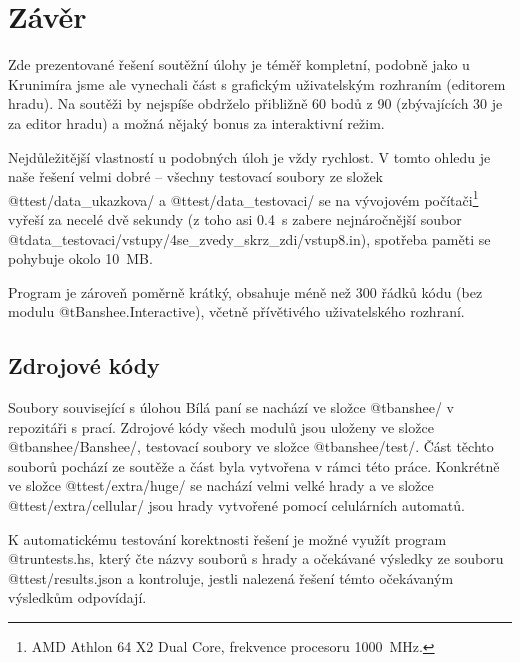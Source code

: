 




\section{Závěr}

Zde prezentované řešení soutěžní úlohy je téměř kompletní, podobně jako u
Krunimíra jsme ale vynechali část s grafickým uživatelským rozhraním (editorem
hradu). Na soutěži by nejspíše obdrželo přibližně 60 bodů z 90 (zbývajících 30
je za editor hradu) a možná nějaký bonus za interaktivní režim.

Nejdůležitější vlastností u podobných úloh je vždy rychlost. V tomto ohledu je
naše řešení velmi dobré -- všechny testovací soubory ze složek
@t{test/data_ukazkova/} a @t{test/data_testovaci/} se na vývojovém
počítači\footnote{AMD Athlon\texttrademark{} 64 X2 Dual Core, frekvence
procesoru 1000~MHz.} vyřeší za necelé dvě sekundy (z toho asi 0.4~s zabere
nejnáročnější soubor @t{data_testovaci/vstupy/4se_zvedy_skrz_zdi/vstup8.in}),
spotřeba paměti se pohybuje okolo 10~MB.

Program je zároveň poměrně krátký, obsahuje méně než 300 řádků kódu (bez modulu
@t{Banshee.Interactive}), včetně přívětivého uživatelského rozhraní.

\subsection{Zdrojové kódy}

Soubory související s úlohou Bílá paní se nachází ve složce @t{banshee/} v
repozitáři s prací. Zdrojové kódy všech modulů jsou uloženy ve složce
@t{banshee/Banshee/}, testovací soubory ve složce @t{banshee/test/}. Část těchto
souborů pochází ze soutěže a část byla vytvořena v rámci této práce. Konkrétně
ve složce @t{test/extra/huge/} se nachází velmi velké hrady a ve složce
@t{test/extra/cellular/} jsou hrady vytvořené pomocí celulárních automatů.

K automatickému testování korektnosti řešení je možné využít program
@t{runtests.hs}, který čte názvy souborů s hrady a očekávané výsledky ze
souboru @t{test/results.json} a kontroluje, jestli nalezená řešení témto
očekávaným výsledkům odpovídají.
